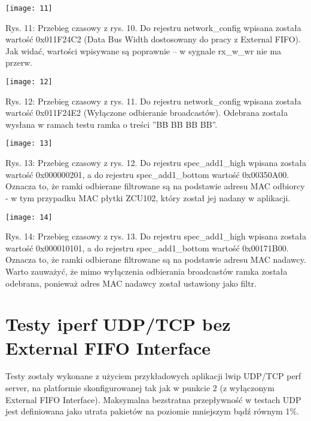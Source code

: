 \documentclass[11pt, letterpaper]{article}
\begin{document}
\texttt{[image: 11]}
\begin{center}
\caption{Rys. 11: Przebieg czasowy z rys. 10. Do rejestru network\_config wpisana została wartość 0x011F24C2 (Data Bus Width dostosowany do pracy z External FIFO). Jak widać, wartości wpisywane są poprawnie – w sygnale rx\_w\_wr nie ma przerw.}
\end{center}
\vspace{5mm}

\texttt{[image: 12]}
\begin{center}
\caption{Rys. 12: Przebieg czasowy z rys. 11. Do rejestru network\_config wpisana została wartość 0x011F24E2 (Wyłączone odbieranie broadcastów). Odebrana została wysłana w ramach testu ramka o treści ”BB BB BB BB”.}
\end{center}
\vspace{5mm}

\texttt{[image: 13]}
\begin{center}
\caption{Rys. 13: Przebieg czasowy z rys. 12. Do rejestru spec\_add1\_high wpisana została wartość 0x000000201, a do rejestru spec\_add1\_bottom wartość 0x00350A00. Oznacza to, że ramki odbierane filtrowane są na podstawie adresu MAC odbiorcy - w tym przypadku MAC płytki ZCU102, który został jej nadany w aplikacji.}
\end{center}
\vspace{5mm}

\texttt{[image: 14]}
\begin{center}
\caption{Rys. 14: Przebieg czasowy z rys. 13. Do rejestru spec\_add1\_high wpisana została wartość 0x000010101, a do rejestru spec\_add1\_bottom wartość 0x00171B00. Oznacza to, że ramki odbierane filtrowane są na podstawie adresu MAC nadawcy. Warto zauważyć, że mimo wyłączenia odbierania broadcastów ramka została odebrana, ponieważ adres MAC nadawcy został ustawiony jako filtr.}
\end{center}
\vspace{5mm}

\section{Testy iperf UDP/TCP bez External FIFO Interface}
Testy zostały wykonane z użyciem przykładowych aplikacji lwip UDP/TCP perf server, na platformie skonfigurowanej tak jak w punkcie 2 (z wyłączonym External FIFO Interface).
Maksymalna bezstratna przepływność w testach UDP jest definiowana jako utrata pakietów na poziomie mniejszym bądź równym 1\%.
\end{document}
